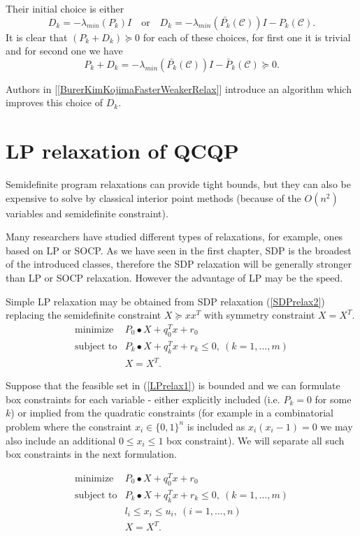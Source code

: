 \documentclass[12pt]{book}
\theoremstyle{definition}
\begin{document}
Their initial choice is either 
$$D_k = -\lambda_{min}(P_k)I  \ \ \ \mbox{ or } \ \ \  D_k =-\lambda_{min}(\bar{P_k}(\mathcal{C}))I - P_k(\mathcal{C}).$$
It is clear that $(P_k + D_k)\succeq 0$ for each of these choices, for first one it is trivial and for second one we have
$$P_k+D_k =  -\lambda_{min}(\bar{P_k}(\mathcal{C}))I - \bar{P}_k(\mathcal{C})\succeq 0.$$

Authors in [\ref{BurerKimKojimaFasterWeakerRelax}] introduce an algorithm which improves this choice of $D_k$.

\section{LP relaxation of QCQP}
\label{SectionLPRelaxationsOfQCQP}

Semidefinite program relaxations can provide tight bounds, but they can also be expensive to solve by classical interior point methods (because of the $O(n^2)$ variables and semidefinite constraint). 

Many researchers have studied different types of relaxations, for example, ones based on LP or SOCP. 
As we have seen in the first chapter, SDP is the broadest of the introduced classes, therefore the SDP relaxation will be generally stronger than LP or SOCP relaxation. However the advantage of LP may be the speed. 

Simple LP relaxation may be obtained from SDP relaxation (\ref{SDPrelax2}) replacing the semidefinite constraint $X\succeq xx^T$ with symmetry constraint $X = X^T$.
\begin{equation}
\label{LPrelax1} 
\begin{array}{ll}
\mbox{minimize}& P_0\bullet X + q_0^Tx + r_0\\
\mbox{subject to}& P_k\bullet X+ q_k^Tx + r_k \leq 0, \  (k = 1,\dots ,m)\\
& X = X^T.
\end{array} 
\end{equation}

Suppose that the feasible set in (\ref{LPrelax1}) is bounded and we can formulate box constraints for each variable - either explicitly included (i.e.  $P_k=0$ for some $k$) or implied from the quadratic constraints (for example in a combinatorial problem where the constraint $x_i\in \{0,1\}^n$ is included as $x_i(x_i-1) = 0$ we may also include an additional $0\leq x_i \leq 1$ box constraint). We will separate all such box constraints in the next formulation. 

\begin{equation}
\label{LPrelax2} 
\begin{array}{ll}
\mbox{minimize}& P_0\bullet X + q_0^Tx + r_0\\
\mbox{subject to}& P_k\bullet X+ q_k^Tx + r_k \leq 0, \  (k = 1,\dots ,m)\\
 				& l_i\leq x_i \leq u_i, \ (i = 1,\dots ,n)\\
& X = X^T.
\end{array} 
\end{equation}
\end{document}
